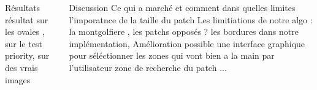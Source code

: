 \documentclass[final,hyperref={pdfpagelabels=false}]{beamer}
\begin{document}
\begin{frame}[t]
\begin{columns}[t]
\begin{column}{.465\textwidth}
\begin{block}{Résultats}
résultat sur les ovales , sur le test priority, sur des vrais images 


\end{block}
\end{column}


\begin{column}{.465\textwidth}
\begin{block}{Discussion}
Ce qui a marché et comment dans quelles limites 
l'imporatnce de la taille du patch 
Les limitiations de notre algo : la montgolfiere , les patchs opposés ? 
les bordures dans notre implémentation,
Amélioration possible
une interface graphique pour séléctionner les zones qui vont bien a la main par l'utilisateur 
zone de recherche du patch ... 
\end{block}
\end{column}


\end{columns}
\end{frame}

\end{document}
